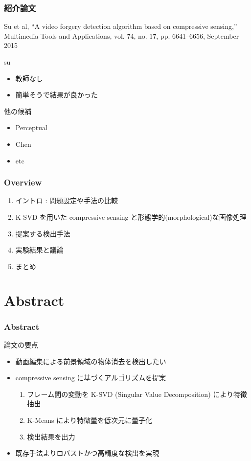\begin{frame}\frametitle{紹介論文}
Su et al, ``A video forgery detection algorithm based on compressive sensing,'' Multimedia Tools and Applications, vol. 74, no. 17, pp. 6641–6656, September 2015 \cite{Su2015}

\begin{block}{su}
\begin{itemize}
    \item 教師なし
    \item 簡単そうで結果が良かった
\end{itemize}
\end{block}

他の候補
\begin{itemize}
    \item Perceptual
    \item Chen
    \item etc
\end{itemize}
\end{frame}


\begin{frame}\frametitle{Overview}
\begin{enumerate}
    \item イントロ : 問題設定や手法の比較
    \item K-SVD を用いた compressive sensing と形態学的(morphological)な画像処理
    \item 提案する検出手法
    \item 実験結果と議論
    \item まとめ
\end{enumerate}
\end{frame}

\section{Abstract}
\begin{frame}\frametitle{Abstract}
論文の要点
\begin{itemize}
    \item 動画編集による前景領域の物体消去を検出したい
    \item compressive sensing に基づくアルゴリズムを提案
    \begin{enumerate}
        \item フレーム間の変動を K-SVD (Singular Value Decomposition) により特徴抽出
        \item K-Means により特徴量を低次元に量子化
        \item 検出結果を出力
    \end{enumerate}
    \item 既存手法よりロバストかつ高精度な検出を実現
\end{itemize}
\end{frame}
